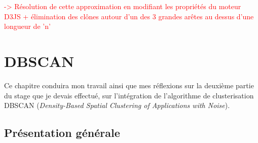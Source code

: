 \documentclass{report}
\begin{document}
\textcolor{red}{-> Résolution de cette approximation en modifiant les propriétés du moteur D3JS + élimination des clônes autour d'un des 3 grandes arêtes au dessus d'une longueur de 'n'}
\newline

\chapter{DBSCAN}

Ce chapitre conduira mon travail ainsi que mes réflexions sur la deuxième partie du stage que je devais effectué, sur l'intégration de l'algorithme de clusterisation DBSCAN (\textit{Density-Based Spatial Clustering of Applications with Noise}).

\section{Présentation générale}
\end{document}

